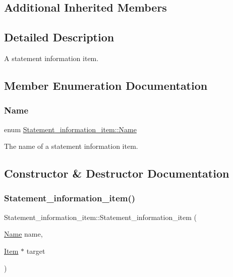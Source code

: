 \subsection*{Additional Inherited Members}


\subsection{Detailed Description}
A statement information item. 

\subsection{Member Enumeration Documentation}
\mbox{\label{classStatement__information__item_ae867c415a95de0d9e6ce1e87a0227031}} 
\subsubsection{\texorpdfstring{Name}{Name}}
{\footnotesize\ttfamily enum \mbox{\hyperlink{classStatement__information__item_ae867c415a95de0d9e6ce1e87a0227031}{Statement\+\_\+information\+\_\+item\+::\+Name}}}

The name of a statement information item. 

\subsection{Constructor \& Destructor Documentation}
\mbox{\label{classStatement__information__item_a23c389e0893d1f0e26552b1f6cc45c69}} 
\subsubsection{\texorpdfstring{Statement\+\_\+information\+\_\+item()}{Statement\_information\_item()}}
{\footnotesize\ttfamily Statement\+\_\+information\+\_\+item\+::\+Statement\+\_\+information\+\_\+item (\begin{DoxyParamCaption}\item[{\mbox{\hyperlink{classStatement__information__item_ae867c415a95de0d9e6ce1e87a0227031}{Name}}}]{name,  }\item[{\mbox{\hyperlink{classItem}{Item}} $\ast$}]{target }\end{DoxyParamCaption})\hspace{0.3cm}{\ttfamily [inline]}}

